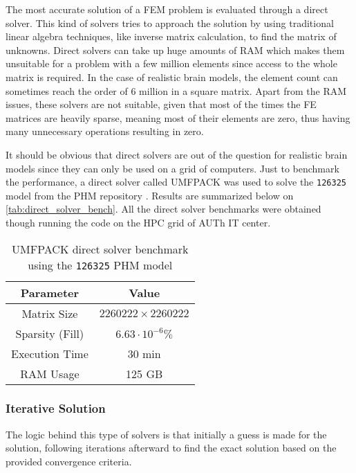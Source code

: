 The most accurate solution of a \gls{FEM} problem is evaluated through a direct solver. This kind of solvers tries to approach the solution by using traditional linear algebra techniques, like inverse matrix calculation, to find the matrix of unknowns. Direct solvers can take up huge amounts of \gls{RAM} which makes them unsuitable for a problem with a few million elements since access to the whole matrix is required. In the case of realistic brain models, the element count can sometimes reach the order of 6 million in a square matrix. Apart from the \gls{RAM} issues, these solvers are not suitable, given that most of the times the \gls{FE} matrices are heavily sparse, meaning most of their elements are zero, thus having many unnecessary operations resulting in zero.

It should be obvious that direct solvers are out of the question for realistic brain models since they can only be used on a grid of computers. Just to benchmark the performance, a direct solver called \gls{UMFPACK} \cite{Davis2004_umfpack} was used to solve the \texttt{126325} model from the \gls{PHM} repository \cite{ErikG.Lee2016}. Results are summarized below on \autoref{tab:direct_solver_bench}. All the direct solver benchmarks were obtained though running the code on the \gls{HPC} grid of \gls{AUTh} \gls{IT} center.

\begin{table}[!ht]
	\centering
	\caption{\gls{UMFPACK} direct solver benchmark using the \texttt{126325} \gls{PHM} model}
	\label{tab:direct_solver_bench}
	\begin{tabular}{|c|c|}
		\hline
		\rowcolor[HTML]{C0C0C0} 
		\textbf{Parameter} & \textbf{Value} \\ \hline
		Matrix Size & $2260222\times 2260222$ \\ \hline
		Sparsity (Fill) & $6.63\cdot 10^{-6}\%$ \\ \hline
		Execution Time & 30 min \\ \hline
		RAM Usage & 125 GB \\ \hline
	\end{tabular}
\end{table}

\subsubsection{Iterative Solution}
\label{subsec:iterative_solvers}

The logic behind this type of solvers is that initially a guess is made for the solution, following iterations afterward to find the exact solution based on the provided convergence criteria.

